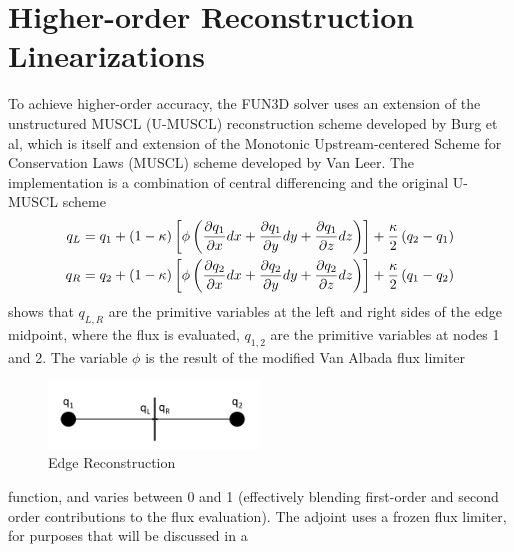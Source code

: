 \section{Higher-order Reconstruction Linearizations}

To achieve higher-order accuracy, the FUN3D solver uses an extension of the
unstructured MUSCL (U-MUSCL) reconstruction scheme developed by Burg et
al\cite{burg2005higher,burg2003verification}, which is itself and extension of
the Monotonic Upstream-centered Scheme for Conservation Laws (MUSCL) scheme
developed by Van Leer\cite{van1979towards}.  The implementation is a combination
of central differencing and the original U-MUSCL scheme
\begin{equation}
  \begin{aligned}
    q_L &= q_1 + (1-\kappa)\left[ \phi\left( \frac{\partial q_1}{\partial x}dx + \frac{\partial q_1}{\partial y}dy +
    \frac{\partial q_1}{\partial z}dz \right) \right] + \frac{\kappa}{2}\left( q_2 - q_1 \right) \\
    q_R &= q_2 + (1-\kappa)\left[ \phi\left( \frac{\partial q_2}{\partial x}dx + \frac{\partial q_2}{\partial y}dy +
    \frac{\partial q_2}{\partial z}dz \right) \right] + \frac{\kappa}{2}\left( q_1 - q_2 \right)
  \end{aligned}
  \label{u-muscl}
\end{equation}
 shows that $q_{L,R}$ are the primitive variables at the
left and right sides of the edge midpoint, where the flux is evaluated,
$q_{1,2}$ are the primitive variables at nodes 1 and 2.  The variable $\phi$ is
the result of the modified Van Albada flux limiter
\begin{figure}[h]
  \centering
  \includegraphics[width=0.5\textwidth]{figures/edge_reconstruction.png}
  \caption{Edge Reconstruction}
  \label{fig:edge-recons}
\end{figure}
function\cite{van1997comparative}, and varies between 0 and 1 (effectively
blending first-order and second order contributions to the flux evaluation).
The adjoint uses a frozen flux limiter, for purposes that will be discussed in a
